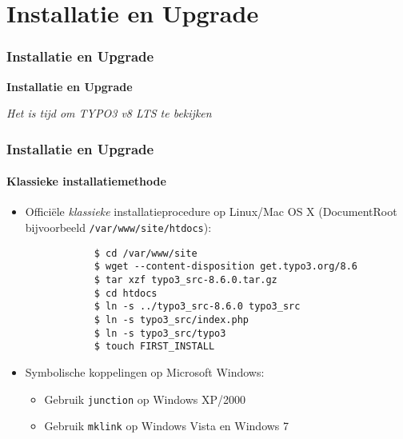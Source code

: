 %

\section{Installatie en Upgrade}
\begin{frame}[fragile]
	\frametitle{Installatie en Upgrade}

	\begin{center}\huge{\color{typo3darkgrey}\textbf{Installatie en Upgrade}}\end{center}
	\begin{center}\large{\textit{Het is tijd om TYPO3 v8 LTS te bekijken}}\end{center}

\end{frame}

\begin{frame}[fragile]
	\frametitle{Installatie en Upgrade}
	\framesubtitle{Klassieke installatiemethode}

	\begin{itemize}
		\item Officiële \textit{klassieke} installatieprocedure op Linux/Mac OS X\newline
			(DocumentRoot bijvoorbeeld \texttt{/var/www/site/htdocs}):
		\begin{lstlisting}
			$ cd /var/www/site
			$ wget --content-disposition get.typo3.org/8.6
			$ tar xzf typo3_src-8.6.0.tar.gz
			$ cd htdocs
			$ ln -s ../typo3_src-8.6.0 typo3_src
			$ ln -s typo3_src/index.php
			$ ln -s typo3_src/typo3
			$ touch FIRST_INSTALL
		\end{lstlisting}

		\item Symbolische koppelingen op Microsoft Windows:

			\begin{itemize}
				\item Gebruik \texttt{junction} op Windows XP/2000
				\item Gebruik \texttt{mklink} op Windows Vista en Windows 7
			\end{itemize}

	\end{itemize}
\end{frame}

